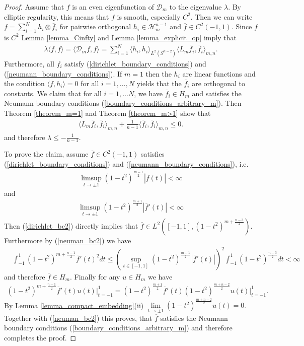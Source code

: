 \documentclass[12pt,twoside]{amsart}
\numberwithin{satz}{section}
\theoremstyle{definition}
\numberwithin{equation}{section}
\begin{document}
	\begin{proof}
		Assume that $f$ is an even eigenfunction of $\mathcal{D}_m$ to the eigenvalue $\lambda$. By elliptic regularity, this means that $f$ is smooth, especially $C^2$. Then we can write $f=\sum_{i=1}^{N}h_i\otimes \overline{f}_i$ for pairwise orthogonal $h_i\in\mathcal{H}_m^{n-1}$ and $\overline{f}\in C^2(-1,1)$. Since $f$ is $C^2$ Lemma \ref{lemma_Cinfty} and Lemma \ref{lemma_explicit_op} imply that
		\begin{align*}
			\lambda\langle f,f\rangle=\langle \mathcal{D}_mf,f\rangle = \sum_{i=1}^N \langle h_i,h_i\rangle_{L^2(S^{n-2})} \langle L_m\overline{f}_i,\overline{f}_i\rangle_{m,n}.
		\end{align*}
		Furthermore, all $f_i$ satisfy (\ref{dirichlet_boundary_conditions}) and (\ref{neumann_boundary_conditions}). If $m=1$ then the $h_i$ are linear functions and the condition $\langle f,h_i\rangle=0$ for all $i=1,\dots,N$ yields that the $\overline{f}_i$ are orthogonal to constants. We claim that for all $i=1,\dots N$, we have $\overline{f}_i\in H_m$ and satisfies the Neumann boundary conditions (\ref{boundary_conditions_arbitrary_m}). Then Theorem \ref{theorem_m=1} and Theorem \ref{theorem_m>1} show that
		\begin{align*}
			\langle L_m\overline{f}_i,\overline{f}_i\rangle_{m,n} + \frac{1}{n-1}\langle \overline{f}_i,\overline{f}_i\rangle_{m,n} \leq 0.
		\end{align*}
		and therefore $\lambda\leq -\frac{1}{n-1}$. 
		
		To prove the claim, assume $\overline{f}\in C^2(-1,1)$ satisfies (\ref{dirichlet_boundary_conditions}) and (\ref{neumann_boundary_conditions}), i.e.
		\begin{align}\label{dirichlet_bc2}
			\limsup\limits_{t\to\pm 1}(1-t^2)^{\frac{m-1}{2}}\left|\overline{f}(t)\right|<\infty
		\end{align}
		and
		\begin{align}\label{neuman_bc2}
			\limsup\limits_{t\to\pm 1} (1-t^2)^{\frac{m+1}{2}}\left|\overline{f}'(t)\right|<\infty
		\end{align}
		Then (\ref{dirichlet_bc2}) directly implies that $\overline{f}\in L^2([-1,1],(1-t^2)^{m+\frac{n-3}{2}})$. Furthermore by (\ref{neuman_bc2}) we have
		\begin{align*}
			&\int_{-1}^1 (1-t^2)^{m+\frac{n-1}{2}}\overline{f}'(t)^2dt \leq \left(\sup_{t\in[-1,1]}(1-t^2)^{\frac{m+1}{2}}\left|\overline{f}'(t)\right|\right)^2\int_{-1}^1(1-t^2)^{\frac{n-3}{2}}dt<\infty
		\end{align*}
		and therefore $\overline{f}\in H_m$. Finally for any $u\in H_m$ we have
		\begin{align*}
			(1-t^2)^{m+\frac{n-1}{2}}\overline{f}'(t)u(t)\big|_{t=-1}^1=(1-t^2)^{\frac{m+1}{2}}\overline{f}'(t) (1-t^2)^{\frac{m+n-2}{2}}u(t)\big|_{t=-1}^1.
		\end{align*}
		By Lemma \ref{lemma_compact_embedding}(ii) $\lim\limits_{t\to\pm 1}(1-t^2)^{\frac{m+n-2}{2}}u(t)=0$. Together with (\ref{neuman_bc2}) this proves, that $\overline{f}$ satisfies the Neumann boundary conditions (\ref{boundary_conditions_arbitrary_m}) and therefore completes the proof.
	\end{proof}
	
\end{document}
